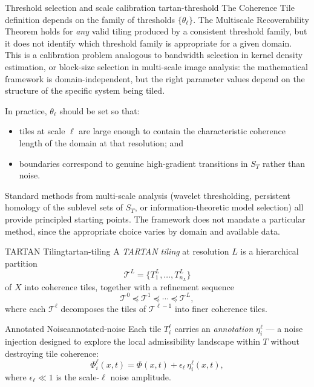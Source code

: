 \documentclass[12pt,twoside,openright]{book}
\begin{document}
\begin{remark}{Threshold selection and scale calibration}%
  {tartan-threshold}
  The Coherence Tile definition depends on the family of
  thresholds $\{\theta_\ell\}$. The Multiscale
  Recoverability Theorem holds for \emph{any} valid tiling
  produced by a consistent threshold family, but it does
  not identify which threshold family is appropriate for a
  given domain. This is a calibration problem analogous to
  bandwidth selection in kernel density estimation, or
  block-size selection in multi-scale image analysis: the
  mathematical framework is domain-independent, but the
  right parameter values depend on the structure of the
  specific system being tiled.

  In practice, $\theta_\ell$ should be set so that:
  \begin{itemize}[nosep]
    \item tiles at scale $\ell$ are large enough to
          contain the characteristic coherence length of
          the domain at that resolution; and
    \item boundaries correspond to genuine high-gradient
          transitions in $S_T$ rather than noise.
  \end{itemize}
  Standard methods from multi-scale analysis (wavelet
  thresholding, persistent homology of the sublevel sets
  of $S_T$, or information-theoretic model selection)
  all provide principled starting points. The framework
  does not mandate a particular method, since the
  appropriate choice varies by domain and available data.
\end{remark}

\begin{definition}{TARTAN Tiling}{tartan-tiling}
  A \emph{TARTAN tiling} at resolution $L$ is a
  hierarchical partition
  \[
    \mathcal{T}^L = \{T^L_1, \ldots, T^L_{n_L}\}
  \]
  of $X$ into coherence tiles, together with a
  refinement sequence
  \[
    \mathcal{T}^0 \preceq \mathcal{T}^1 \preceq
    \cdots \preceq \mathcal{T}^L,
  \]
  where each $\mathcal{T}^\ell$ decomposes the tiles of
  $\mathcal{T}^{\ell-1}$ into finer coherence tiles.
\end{definition}

\begin{definition}{Annotated Noise}{annotated-noise}
  Each tile $T^\ell_i$ carries an \emph{annotation}
  $\eta^\ell_i$ — a noise injection designed to
  explore the local admissibility landscape within $T$
  without destroying tile coherence:
  \[
    \Phi^\ell_i(x,t)
    = \Phi(x,t) + \epsilon_\ell \, \eta^\ell_i(x,t),
  \]
  where $\epsilon_\ell \ll 1$ is the scale-$\ell$
  noise amplitude.
\end{definition}
\end{document}
